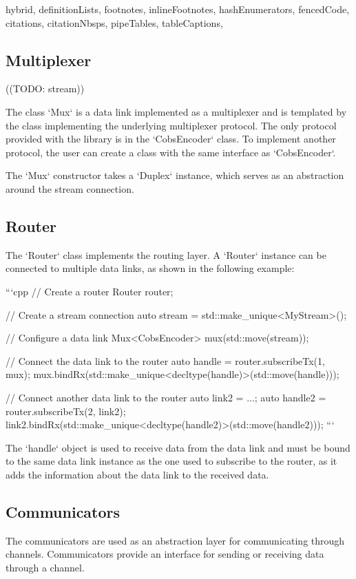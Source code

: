 \begin{markdown*}{%
  hybrid,
  definitionLists,
  footnotes,
  inlineFootnotes,
  hashEnumerators,
  fencedCode,
  citations,
  citationNbsps,
  pipeTables,
  tableCaptions,
}
\subsection{Multiplexer}

((TODO: stream))

The class `Mux` is a data link implemented as a multiplexer and is templated by the class implementing the underlying multiplexer protocol. The only protocol provided with the library is in the `CobsEncoder` class. To implement another protocol, the user can create a class with the same interface as `CobsEncoder`.

The `Mux` constructor takes a `Duplex` instance, which serves as an abstraction around the stream connection.

\subsection{Router}

The `Router` class implements the routing layer. A `Router` instance can be connected to multiple data links, as shown in the following example:

```cpp
// Create a router
Router router;

// Create a stream connection
auto stream = std::make_unique<MyStream>();

// Configure a data link
Mux<CobsEncoder> mux(std::move(stream));

// Connect the data link to the router
auto handle = router.subscribeTx(1, mux);
mux.bindRx(std::make_unique<decltype(handle)>(std::move(handle)));

// Connect another data link to the router
auto link2 = ...;
auto handle2 = router.subscribeTx(2, link2);
link2.bindRx(std::make_unique<decltype(handle2)>(std::move(handle2)));
```

The `handle` object is used to receive data from the data link and must be bound to the same data link instance as the one used to subscribe to the router, as it adds the information about the data link to the received data.

\subsection{Communicators}

The communicators are used as an abstraction layer for communicating through channels. Communicators provide an interface for sending or receiving data through a channel.


\end{markdown*}
